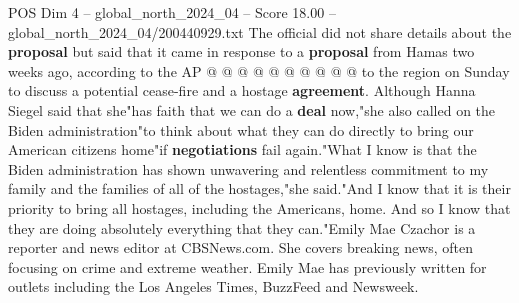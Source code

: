 \begin{textsample}{POS Dim 4 – global\_north\_2024\_04 – Score 18.00 – global\_north\_2024\_04/200440929.txt}
The official did not share details about the \textbf{proposal} but said that it came in response to a \textbf{proposal} from Hamas two weeks ago, according to the AP @ @ @ @ @ @ @ @ @ @ to the region on Sunday to discuss a potential cease-fire and a hostage \textbf{agreement}.
Although Hanna Siegel said that she"has faith that we can do a \textbf{deal} now,"she also called on the Biden administration"to think about what they can do directly to bring our American citizens home"if \textbf{negotiations} fail again."What I know is that the Biden administration has shown unwavering and relentless commitment to my family and the families of all of the hostages,"she said."And I know that it is their priority to bring all hostages, including the Americans, home.
And so I know that they are doing absolutely everything that they can."Emily Mae Czachor is a reporter and news editor at CBSNews.com.
She covers breaking news, often focusing on crime and extreme weather.
Emily Mae has previously written for outlets including the Los Angeles Times, BuzzFeed and Newsweek.

\end{textsample}

